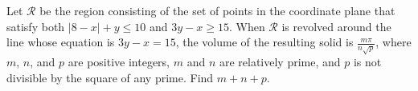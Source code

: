 Let $ \mathcal{R}$ be the region consisting of the set of points in the coordinate plane that satisfy both $ |8 - x| + y \le 10$ and $ 3y - x \ge 15$. When $ \mathcal{R}$ is revolved around the line whose equation is $ 3y - x = 15$, the volume of the resulting solid is $ \frac {m\pi}{n\sqrt {p}}$, where $ m$, $ n$, and $ p$ are positive integers, $ m$ and $ n$ are relatively prime, and $ p$ is not divisible by the square of any prime. Find $ m + n + p$.